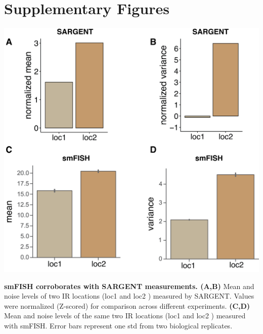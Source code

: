 \clearpage
\section{Supplementary Figures}

\beginsupplement

\begin{suppfigure}[t]  
    \centering
    \includegraphics[width=\linewidth]{figures/cas/cas_suppfigure1.png}
    \caption[smFISH corroborates with SARGENT measurements.]{
        \textbf{smFISH corroborates with SARGENT measurements. (A,B)}
        Mean and noise levels of two IR locations (loc1  and loc2 ) measured by SARGENT. Values were normalized (Z-scored) for comparison across different experiments.
        \textbf{(C,D)}
        Mean and noise levels of the same two IR locations (loc1  and loc2 ) measured with smFISH. Error bars represent one std from two biological replicates. 
    }
    \label{fig:cas_figureS1}
\end{suppfigure}

